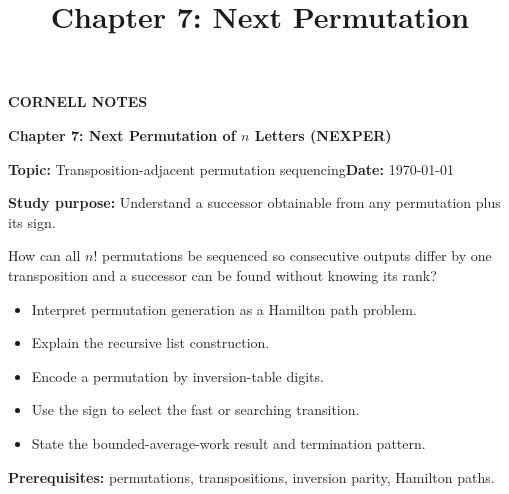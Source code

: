 \documentclass[10pt,letterpaper]{article}
\title{Chapter 7: Next Permutation}
\author{}
\date{}
\begin{document}
\maketitle
\begin{tcolorbox}[colback=Paper,colframe=Ink]{\small\bfseries\color{Teal}CORNELL NOTES}\par{\LARGE\bfseries Chapter 7: Next Permutation of $n$ Letters (NEXPER)}\par\medskip\textbf{Topic:} Transposition-adjacent permutation sequencing\hfill\textbf{Date:} \today\par\textbf{Study purpose:} Understand a successor obtainable from any permutation plus its sign.\end{tcolorbox}
\begin{tcolorbox}[colback=Teal!5,colframe=Teal,title=Essential question]How can all $n!$ permutations be sequenced so consecutive outputs differ by one transposition and a successor can be found without knowing its rank?\end{tcolorbox}
\begin{tcolorbox}[colback=white,colframe=Mist,title=Learning objectives]\begin{itemize}\item Interpret permutation generation as a Hamilton path problem.\item Explain the recursive list construction.\item Encode a permutation by inversion-table digits.\item Use the sign to select the fast or searching transition.\item State the bounded-average-work result and termination pattern.\end{itemize}\textbf{Prerequisites:} permutations, transpositions, inversion parity, Hamilton paths.\end{tcolorbox}
\end{document}
